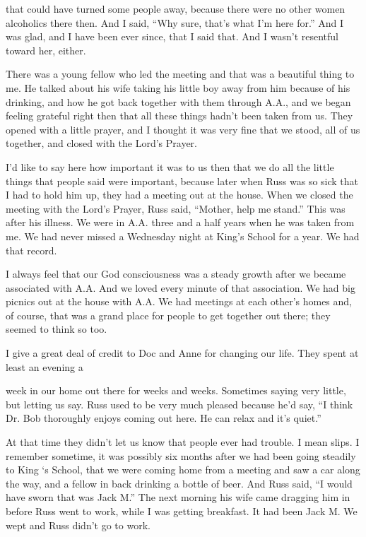 that could have turned some people away, because there were no other women alcoholics there then. And I said, “Why sure, that’s what I’m here for.” And I was glad, and I have been ever since, that I said that. And I wasn’t resentful toward her, either.

There was a young fellow who led the meeting and that was a beautiful thing to me. He talked about his wife taking his little boy away from him because of his drinking, and how he got back together with them through A.A., and we began feeling grateful right then that all these things hadn’t been taken from us. They opened with a little prayer, and I thought it was very fine that we stood, all of us together, and closed with the Lord’s Prayer.

I’d like to say here how important it was to us then that we do all the little things that people said were important, because later when Russ was so sick that I had to hold him up, they had a meeting out at the house. When we closed the meeting with the Lord’s Prayer, Russ said, “Mother, help me stand.” This was after his illness. We were in A.A. three and a half years when he was taken from me. We had never missed a Wednesday night at King’s School for a year. We had that record.

I always feel that our God consciousness was a steady growth after we became associated with A.A. And we loved every minute of that association. We had big picnics out at the house with A.A. We had meetings at each other’s homes and, of course, that was a grand place for people to get together out there; they seemed to think so too.

I give a great deal of credit to Doc and Anne for changing our life. They spent at least an evening a

week in our home out there for weeks and weeks. Sometimes saying very little, but letting us say. Russ used to be very much pleased because he’d say, “I think Dr. Bob thoroughly enjoys coming out here. He can relax and it’s quiet.”

At that time they didn’t let us know that people ever had trouble. I mean slips. I remember sometime, it was possibly six months after we had been going steadily to King ‘s School, that we were coming home from a meeting and saw a car along the way, and a fellow in back drinking a bottle of beer. And Russ said, “I would have sworn that was Jack M.” The next morning his wife came dragging him in before Russ went to work, while I was getting breakfast. It had been Jack M. We wept and Russ didn’t go to work.


